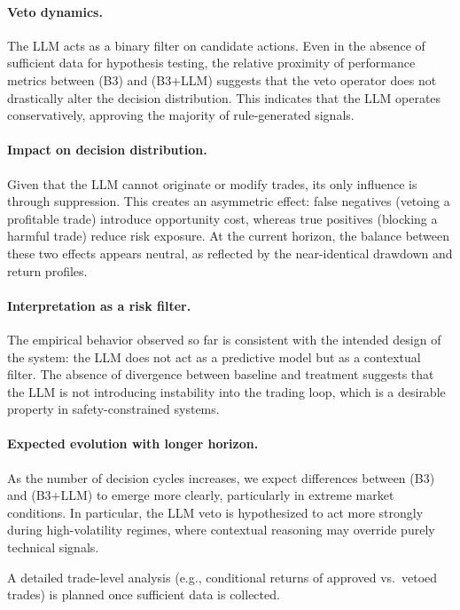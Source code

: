 \documentclass{article}
\begin{document}
\paragraph{Veto dynamics.}
The LLM acts as a binary filter on candidate actions. Even in the absence of sufficient data for hypothesis testing, the relative proximity of performance metrics between (B3) and (B3+LLM) suggests that the veto operator does not drastically alter the decision distribution. This indicates that the LLM operates conservatively, approving the majority of rule-generated signals.

\paragraph{Impact on decision distribution.}
Given that the LLM cannot originate or modify trades, its only influence is through suppression. This creates an asymmetric effect: false negatives (vetoing a profitable trade) introduce opportunity cost, whereas true positives (blocking a harmful trade) reduce risk exposure. At the current horizon, the balance between these two effects appears neutral, as reflected by the near-identical drawdown and return profiles.

\paragraph{Interpretation as a risk filter.}
The empirical behavior observed so far is consistent with the intended design of the system: the LLM does not act as a predictive model but as a contextual filter. The absence of divergence between baseline and treatment suggests that the LLM is not introducing instability into the trading loop, which is a desirable property in safety-constrained systems.

\paragraph{Expected evolution with longer horizon.}
As the number of decision cycles increases, we expect differences between (B3) and (B3+LLM) to emerge more clearly, particularly in extreme market conditions. In particular, the LLM veto is hypothesized to act more strongly during high-volatility regimes, where contextual reasoning may override purely technical signals.

A detailed trade-level analysis (e.g., conditional returns of approved vs.\ vetoed trades) is planned once sufficient data is collected.
\end{document}
